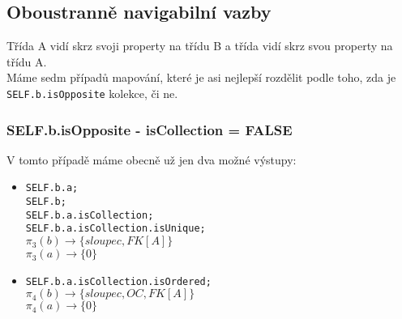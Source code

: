 \documentclass[11pt,a4paper]{article}
\begin{document}
   	\subsection{Oboustranně navigabilní vazby}
   		Třída A vidí skrz svoji property na třídu B a třída vidí skrz svou property na třídu A. \\
   		Máme sedm případů mapování, které je asi nejlepší rozdělit podle toho, zda je \texttt   {SELF.b.isOpposite} kolekce, či ne.
   		\subsubsection{SELF.b.isOpposite - isCollection = FALSE}
   		V tomto případě máme obecně už jen dva možné výstupy:
   		   		\begin{itemize}				    
         			\item \texttt	{SELF.b.a; \\
         							 SELF.b; \\
         							 SELF.b.a.isCollection;\\
         							 SELF.b.a.isCollection.isUnique;\\
         							$\pi_3(b) \to \{ sloupec, FK[A]\}$ \\
         							$\pi_3(a) \to \{ 0\}$
         							}
         			\item \texttt	{SELF.b.a.isCollection.isOrdered; \\}
         							$\pi_4(b) \to \{ sloupec, OC, FK[A]\}$ \\
         							$\pi_4(a) \to \{ 0\}$  		  							
   				\end{itemize}
\end{document}
